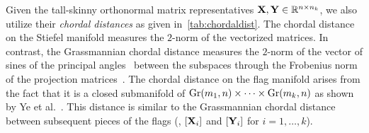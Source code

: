 Given the tall-skinny orthonormal matrix representatives $\mathbf{X},\mathbf{Y} \in \mathbb{R}^{n \times n_k}$, we also utilize their \emph{chordal distances} as given in~\cref{tab:chordaldist}. 
The chordal distance on the Stiefel manifold measures the $2$-norm of the vectorized matrices. In contrast, the Grassmannian chordal distance measures the $2$-norm of the vector of sines of the principal angles~\cite{bjorck1973numerical} between the subspaces through the Frobenius norm of the projection matrices~\cite{edelman1998geometry}. The chordal distance on the flag manifold arises from the fact that it is a closed submanifold of $\mathrm{Gr}(m_1,n) \times \cdots \times \mathrm{Gr}(m_k,n)$ as shown by Ye et al.~\cite[Proposition 3.2]{ye2022optimization}. This distance is similar to the Grassmannian chordal distance between subsequent pieces of the flags (\eg, $[\mathbf{X}_i]$ and $[\mathbf{Y}_i]$ for $i=1,\dots,k$).



